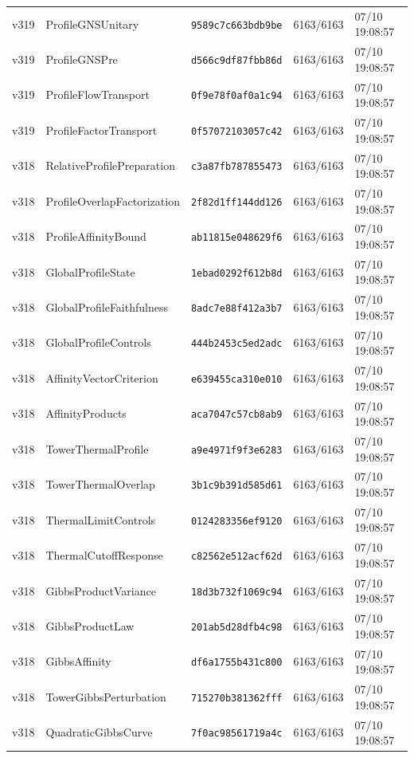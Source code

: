 \documentclass[11pt]{article}
\theoremstyle{definition}\newtheorem{deriv}{Derivation}
\begin{document}
{\begin{longtable}{@{}lllll@{}}
v319 & ProfileGNSUnitary & \texttt{9589c7c663bdb9be} & 6163/6163 & 07/10 19:08:57 \\
v319 & ProfileGNSPre & \texttt{d566c9df87fbb86d} & 6163/6163 & 07/10 19:08:57 \\
v319 & ProfileFlowTransport & \texttt{0f9e78f0af0a1c94} & 6163/6163 & 07/10 19:08:57 \\
v319 & ProfileFactorTransport & \texttt{0f57072103057c42} & 6163/6163 & 07/10 19:08:57 \\
v318 & RelativeProfilePreparation & \texttt{c3a87fb787855473} & 6163/6163 & 07/10 19:08:57 \\
v318 & ProfileOverlapFactorization & \texttt{2f82d1ff144dd126} & 6163/6163 & 07/10 19:08:57 \\
v318 & ProfileAffinityBound & \texttt{ab11815e048629f6} & 6163/6163 & 07/10 19:08:57 \\
v318 & GlobalProfileState & \texttt{1ebad0292f612b8d} & 6163/6163 & 07/10 19:08:57 \\
v318 & GlobalProfileFaithfulness & \texttt{8adc7e88f412a3b7} & 6163/6163 & 07/10 19:08:57 \\
v318 & GlobalProfileControls & \texttt{444b2453c5ed2adc} & 6163/6163 & 07/10 19:08:57 \\
v318 & AffinityVectorCriterion & \texttt{e639455ca310e010} & 6163/6163 & 07/10 19:08:57 \\
v318 & AffinityProducts & \texttt{aca7047c57cb8ab9} & 6163/6163 & 07/10 19:08:57 \\
v318 & TowerThermalProfile & \texttt{a9e4971f9f3e6283} & 6163/6163 & 07/10 19:08:57 \\
v318 & TowerThermalOverlap & \texttt{3b1c9b391d585d61} & 6163/6163 & 07/10 19:08:57 \\
v318 & ThermalLimitControls & \texttt{0124283356ef9120} & 6163/6163 & 07/10 19:08:57 \\
v318 & ThermalCutoffResponse & \texttt{c82562e512acf62d} & 6163/6163 & 07/10 19:08:57 \\
v318 & GibbsProductVariance & \texttt{18d3b732f1069c94} & 6163/6163 & 07/10 19:08:57 \\
v318 & GibbsProductLaw & \texttt{201ab5d28dfb4c98} & 6163/6163 & 07/10 19:08:57 \\
v318 & GibbsAffinity & \texttt{df6a1755b431c800} & 6163/6163 & 07/10 19:08:57 \\
v318 & TowerGibbsPerturbation & \texttt{715270b381362fff} & 6163/6163 & 07/10 19:08:57 \\
v318 & QuadraticGibbsCurve & \texttt{7f0ac98561719a4c} & 6163/6163 & 07/10 19:08:57 \\

\end{longtable}}
\end{document}
